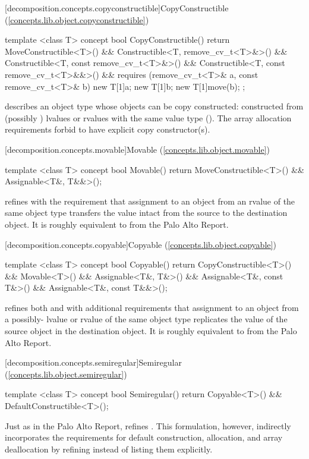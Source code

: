 [decomposition.concepts.copyconstructible]{CopyConstructible (\ref{concepts.lib.object.copyconstructible})}
\begin{codeblock}
template <class T>
concept bool CopyConstructible() {
  return MoveConstructible<T>() &&
    Constructible<T, remove_cv_t<T>&>() &&
    Constructible<T, const remove_cv_t<T>&>() &&
    Constructible<T, const remove_cv_t<T>&&>() &&
    requires (remove_cv_t<T>& a, const remove_cv_t<T>& b) {
      new T[1]{a};
      new T[1]{b};
      new T[1]{move(b)};
    };
}
\end{codeblock}
 describes an object type  whose objects can be copy constructed:
constructed from (possibly ) lvalues or  rvalues with the same value type
(). The array allocation requirements forbid  to have explicit
copy constructor(s).

[decomposition.concepts.movable]{Movable (\ref{concepts.lib.object.movable})}
\begin{codeblock}
template <class T>
concept bool Movable() {
  return MoveConstructible<T>() &&
    Assignable<T&, T&&>();
}
\end{codeblock}
 refines  with the requirement that assignment to an object
from an rvalue of the same object type transfers the value intact from the source to the destination
object. It is roughly equivalent to  from the Palo Alto Report.

[decomposition.concepts.copyable]{Copyable (\ref{concepts.lib.object.copyable})}
\begin{codeblock}
template <class T>
concept bool Copyable() {
  return CopyConstructible<T>() &&
    Movable<T>() &&
    Assignable<T&, T&>() &&
    Assignable<T&, const T&>() &&
    Assignable<T&, const T&&>();
}
\end{codeblock}
 refines both  and  with additional
requirements that assignment to an object from a possibly- lvalue or 
rvalue of the same object type replicates the value of the source object in the destination object.
It is roughly equivalent to  from the Palo Alto Report.

[decomposition.concepts.semiregular]{Semiregular (\ref{concepts.lib.object.semiregular})}
\begin{codeblock}
template <class T>
concept bool Semiregular() {
  return Copyable<T>() &&
    DefaultConstructible<T>();
}
\end{codeblock}
Just as in the Palo Alto Report,  refines . This formulation,
however, indirectly incorporates the requirements for default construction, allocation, and array
deallocation by refining  instead of listing them explicitly.

